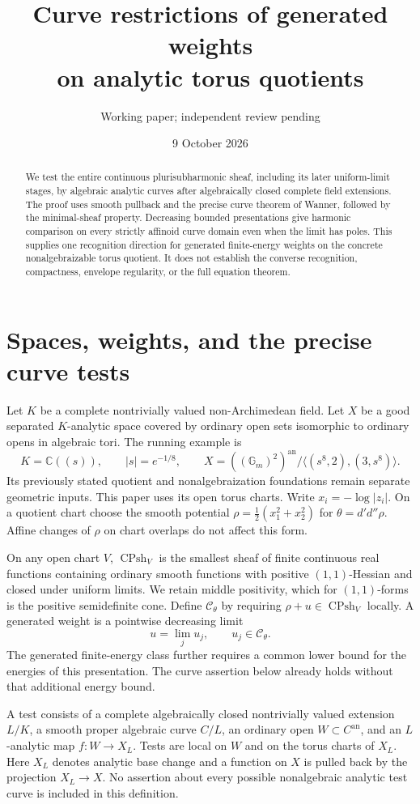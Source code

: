 \documentclass[11pt]{article}
\title{Curve restrictions of generated weights\\on analytic torus quotients}
\author{Working paper; independent review pending}
\date{9 October 2026}
\newcommand{\CPsh}{\operatorname{CPsh}}
\newcommand{\DD}{d'd''}
\begin{document}
\maketitle
\begin{abstract}
We test the entire continuous plurisubharmonic sheaf, including its later
uniform-limit stages, by algebraic analytic curves after algebraically
closed complete field extensions. The proof uses smooth pullback and the
precise curve theorem of Wanner, followed by the minimal-sheaf property.
Decreasing bounded presentations give harmonic comparison on every
strictly affinoid curve domain even when the limit has poles. This supplies
one recognition direction for generated finite-energy weights on the
concrete nonalgebraizable torus quotient. It does not establish the converse
recognition, compactness, envelope regularity, or the full equation theorem.
\end{abstract}

\section{Spaces, weights, and the precise curve tests}
Let $K$ be a complete nontrivially valued non-Archimedean field. Let $X$
be a good separated $K$-analytic space covered by ordinary open sets
isomorphic to ordinary opens in algebraic tori. The running example is
\[
 K=\mathbb C((s)),\qquad |s|=e^{-1/8},\qquad
 X=((\mathbb G_m)^2)^{\mathrm{an}}/
       \langle(s^8,2),(3,s^8)\rangle .
\]
Its previously stated quotient and nonalgebraization foundations remain
separate geometric inputs. This paper uses its open torus charts.
Write $x_i=-\log|z_i|$. On a quotient chart choose the smooth potential
$\rho=\frac12(x_1^2+x_2^2)$ for
$\theta=\DD\rho$. Affine changes of $\rho$ on chart overlaps do not
affect this form.

On any open chart $V$, $\CPsh_V$ is the smallest sheaf of finite continuous
real functions containing ordinary smooth functions with positive
$(1,1)$-Hessian and closed under uniform limits. We retain middle positivity,
which for $(1,1)$-forms is the positive semidefinite cone.
Define $\mathcal C_\theta$ by requiring $\rho+u\in\CPsh_V$ locally.
A generated weight is a pointwise decreasing limit
\[
 u=\lim_j u_j,\qquad u_j\in\mathcal C_\theta.
\]
The generated finite-energy class further requires a common lower bound
for the energies of this presentation. The curve assertion below already
holds without that additional energy bound.

A test consists of a complete algebraically closed nontrivially valued
extension $L/K$, a smooth proper algebraic curve $C/L$, an ordinary open
$W\subset C^{\mathrm{an}}$, and an $L$-analytic map
$f:W\to X_L$. Tests are local on $W$ and on the torus charts of $X_L$.
Here $X_L$ denotes analytic base change and a function on $X$ is pulled
back by the projection $X_L\to X$.
No assertion about every possible nonalgebraic analytic test curve is
included in this definition.
\end{document}
